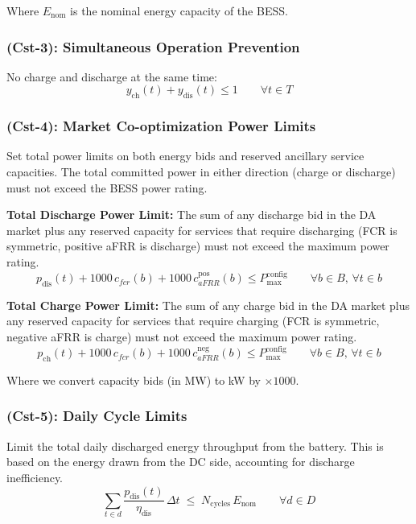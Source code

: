 \documentclass[11pt, a4paper]{article}
\begin{document}
Where $E_{\mathrm{nom}}$ is the nominal energy capacity of the BESS.

\subsubsection*{(Cst-3): Simultaneous Operation Prevention}
No charge and discharge at the same time:
\begin{equation}
    y_{\mathrm{ch}}(t) + y_{\mathrm{dis}}(t) \le 1 \qquad \forall t\in T
\end{equation}

\subsubsection*{(Cst-4): Market Co-optimization Power Limits}
Set total power limits on both energy bids and reserved ancillary service capacities. The total committed power in either direction (charge or discharge) must not exceed the BESS power rating.

\textbf{Total Discharge Power Limit:} The sum of any discharge bid in the DA market plus any reserved capacity for services that require discharging (FCR is symmetric, positive aFRR is discharge) must not exceed the maximum power rating.
\begin{equation}
    p_{\mathrm{dis}}(t) + 1000\,c_{fcr}(b) + 1000\,c^{\mathrm{pos}}_{aFRR}(b) \le P^{\mathrm{config}}_{\max} \qquad \forall b\in B,\, \forall t\in b
\end{equation}

\textbf{Total Charge Power Limit:} The sum of any charge bid in the DA market plus any reserved capacity for services that require charging (FCR is symmetric, negative aFRR is charge) must not exceed the maximum power rating.
\begin{equation}
    p_{\mathrm{ch}}(t) + 1000\,c_{fcr}(b) + 1000\,c^{\mathrm{neg}}_{aFRR}(b) \le P^{\mathrm{config}}_{\max} \qquad \forall b\in B,\, \forall t\in b
\end{equation}

Where we convert capacity bids (in MW) to kW by $\times 1000$.

\subsubsection*{(Cst-5): Daily Cycle Limits}
Limit the total daily discharged energy throughput from the battery. This is based on the energy drawn from the DC side, accounting for discharge inefficiency.
\begin{equation}
    \sum_{t\in d} \frac{p_{\mathrm{dis}}(t)}{\eta_{\mathrm{dis}}}\,\Delta t \;\le\; N_{\mathrm{cycles}}\,E_{\mathrm{nom}}
    \qquad \forall d\in D
\end{equation}
\end{document}
